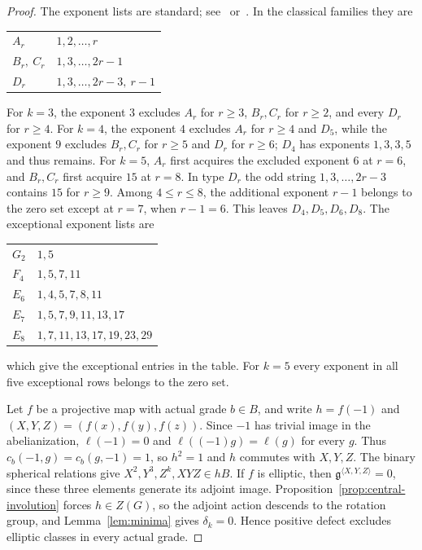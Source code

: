 \documentclass[11pt,a4paper,reqno]{amsart}
\theoremstyle{plain}
\theoremstyle{definition}
\theoremstyle{remark}
\numberwithin{equation}{section}
\newcommand{\fg}{\mathfrak g}
\begin{document}
\begin{proof}
The exponent lists are standard; see~\cite[\S32.3]{EtingofExponents}
or~\cite[Ch.~VI, tables]{Bourbaki}. In the classical families they are
\begin{center}
\begin{tabular}{ll}
\toprule
$A_r$ & $1,2,\ldots,r$\\
$B_r,\ C_r$ & $1,3,\ldots,2r-1$\\
$D_r$ & $1,3,\ldots,2r-3,\ r-1$\\
\bottomrule
\end{tabular}
\end{center}
For $k=3$, the exponent $3$ excludes $A_r$ for $r\ge3$,
$B_r,C_r$ for $r\ge2$, and every $D_r$ for $r\ge4$.
For $k=4$, the exponent $4$ excludes $A_r$ for $r\ge4$ and $D_5$,
while the exponent $9$ excludes $B_r,C_r$ for $r\ge5$ and $D_r$
for $r\ge6$; $D_4$ has exponents $1,3,3,5$ and thus remains.
For $k=5$, $A_r$ first acquires the excluded exponent $6$ at $r=6$, and $B_r,C_r$ first acquire $15$ at $r=8$. In type $D_r$ the odd string $1,3,\ldots,2r-3$ contains $15$ for $r\ge9$. Among $4\le r\le8$, the additional exponent $r-1$ belongs to the zero set except at $r=7$, when $r-1=6$. This leaves $D_4,D_5,D_6,D_8$.
The exceptional exponent lists are
\begin{center}
\begin{tabular}{ll}
\toprule
$G_2$ & $1,5$\\
$F_4$ & $1,5,7,11$\\
$E_6$ & $1,4,5,7,8,11$\\
$E_7$ & $1,5,7,9,11,13,17$\\
$E_8$ & $1,7,11,13,17,19,23,29$\\
\bottomrule
\end{tabular}
\end{center}
which give the exceptional entries in the table. For $k=5$ every exponent in all five exceptional rows belongs to the zero set.

Let $f$ be a projective map with actual grade $b\in B$, and write $h=f(-1)$ and $(X,Y,Z)=(f(x),f(y),f(z))$. Since $-1$ has trivial image in the abelianization, $\ell(-1)=0$ and $\ell((-1)g)=\ell(g)$ for every $g$. Thus $c_b(-1,g)=c_b(g,-1)=1$, so $h^2=1$ and $h$ commutes with $X,Y,Z$. The binary spherical relations give $X^2,Y^3,Z^k,XYZ\in hB$. If $f$ is elliptic, then $\fg^{\langle X,Y,Z\rangle}=0$, since these three elements generate its adjoint image. Proposition~\ref{prop:central-involution} forces $h\in Z(G)$, so the adjoint action descends to the rotation group, and Lemma~\ref{lem:minima} gives $\delta_k=0$. Hence positive defect excludes elliptic classes in every actual grade.


\end{proof}
\end{document}
